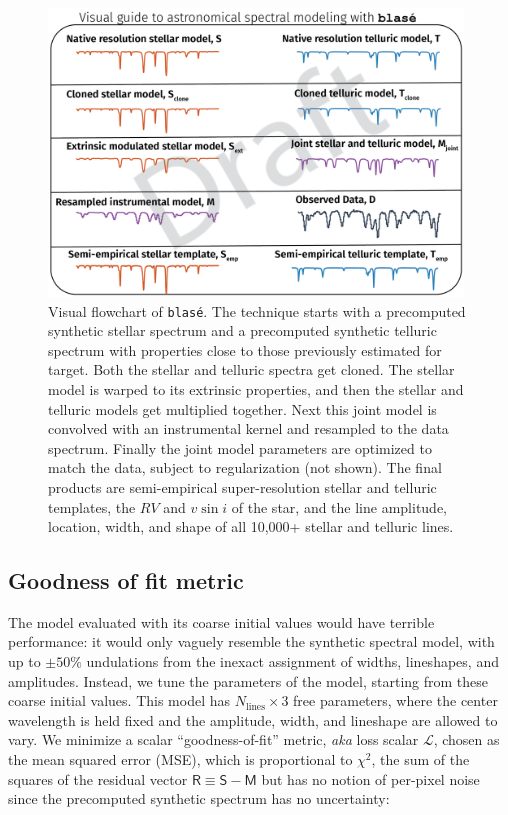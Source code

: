 \documentclass[modern]{aastex631}
\begin{document}
\begin{figure}[hbt!]
    \centering
    \includegraphics[width=0.98\textwidth]{figures/blase_flowchart01.png}
    \caption{Visual flowchart of \texttt{blas\'e}.  The technique starts with a precomputed synthetic stellar spectrum and a precomputed synthetic telluric spectrum with properties close to those previously estimated for target.  Both the stellar and telluric spectra get cloned.  The stellar model is warped to its extrinsic properties, and then the stellar and telluric models get multiplied together.  Next this joint model is convolved with an instrumental kernel and resampled to the data spectrum.  Finally the joint model parameters are optimized to match the data, subject to regularization (not shown).  The final products are semi-empirical super-resolution stellar and telluric templates, the $RV$ and $v\sin{i}$ of the star, and the line amplitude, location, width, and shape of all 10,000+ stellar and telluric lines.  }
    \label{blase_flowchart}
\end{figure}

\subsection{Goodness of fit metric}
The model evaluated with its coarse initial values would have terrible performance: it would only vaguely resemble the synthetic spectral model, with up to $\pm 50\%$ undulations from the inexact assignment of widths, lineshapes, and amplitudes. Instead, we tune the parameters of the model, starting from these coarse initial values. This model has $N_{\mathrm{lines}}\times 3$ free parameters, where the center wavelength is held fixed and the amplitude, width, and lineshape are allowed to vary. We minimize a scalar ``goodness-of-fit'' metric, \emph{aka} loss scalar $\mathcal{L}$, chosen as the mean squared error (MSE), which is proportional to $\chi^2$, the sum of the squares of the residual vector $\mathsf{R} \equiv \mathsf{S}-\mathsf{M}$ but has no notion of per-pixel noise since the precomputed synthetic spectrum has no uncertainty:
\end{document}

